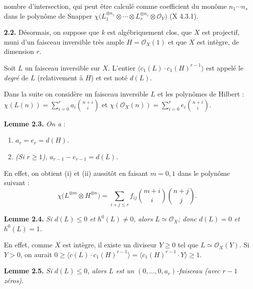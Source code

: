 nombre d'intersection, qui peut être calculé comme coefficient du monôme \(n_1\cdots n_s\) dans le polynôme de Snapper \(\chi\bigl(L_1^{\otimes n_1}\otimes\cdots\otimes L_s^{\otimes n_s}\otimes\mathcal O_Y\bigr)\) (X 4.3.1).

\textbf{2.2.} Désormais, on suppose que \(k\) est algébriquement clos, que \(X\) est projectif, muni d'un faisceau inversible très ample \(H=\mathcal O_X(1)\) et que \(X\) est intègre, de dimension \(r\).

Soit \(L\) un faisceau inversible sur \(X\). L'entier \(\langle c_1(L)\cdot c_1(H)^{r-1}\rangle\) est appelé le \emph{degré} de \(L\) (relativement à \(H\)) et est noté \(d(L)\).

Dans la suite on considère un faisceau inversible \(L\) et les polynômes de Hilbert : \(\chi(L(n))=\sum_{i=0}^{r}a_i\binom{n+i}{i}\) et \(\chi(\mathcal O_X(n))=\sum_{i=0}^{r}e_i\binom{n+i}{i}\).

\textbf{Lemme 2.3.} \emph{On a} :
\begin{enumerate}[label=(\roman*)]
\item \emph{\(a_r=e_r=d(H)\).}
\item \emph{(Si \(r\ge1\)), \(a_{r-1}-e_{r-1}=d(L)\).}
\end{enumerate}

En effet, on obtient (i) et (ii) aussitôt en faisant \(m=0,1\) dans le polynôme suivant :
\[
\chi\bigl(L^{\otimes m}\otimes H^{\otimes n}\bigr)
=
\sum_{i+j\le r} f_{ij}\binom{m+i}{i}\binom{n+j}{j}.
\]

\textbf{Lemme 2.4.} \emph{Si \(d(L)\le0\) et \(h^0(L)\ne0\), alors \(L\simeq\mathcal O_X\); donc \(d(L)=0\) et \(h^0(L)=1\).}

En effet, comme \(X\) est intègre, il existe un diviseur \(Y\ge0\) tel que \(L\simeq\mathcal O_X(Y)\). Si \(Y>0\), on aurait \(0\ge\langle c(L)\cdot c_1(H)^{r-1}\rangle=\langle c_1(H)^{r-1}\cdot Y\rangle\ge1\).

\textbf{Lemme 2.5.} \emph{Si \(d(L)\le0\), alors \(L\) est un \((0,\ldots,0,a_r)\)-faisceau (avec \(r-1\) zéros).}


